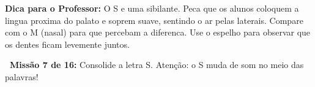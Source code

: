 \begin{dica}
\textbf{Dica para o Professor:} O S e uma sibilante. Peca que os alunos coloquem a lingua proxima do palato e soprem suave, sentindo o ar pelas laterais. Compare com o M (nasal) para que percebam a diferenca. Use o espelho para observar que os dentes ficam levemente juntos.
\end{dica}





\begin{missao}
\textbf{\faGamepad~Miss\~a{}o 7 de 16:} Consolide a letra S. Aten\c{c}\~a{}o: o S muda de som no meio das palavras!
\end{missao}

